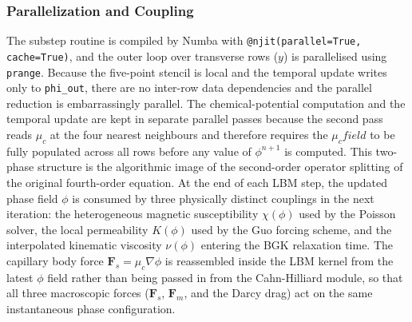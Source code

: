 \subsubsection{Parallelization and Coupling}
The substep routine is compiled by Numba with \texttt{@njit(parallel=True, cache=True)}, and the outer loop over transverse rows ($y$) is parallelised using \texttt{prange}.
Because the five-point stencil is local and the temporal update writes only to \texttt{phi\_out}, there are no inter-row data dependencies and the parallel reduction is embarrassingly parallel.
The chemical-potential computation and the temporal update are kept in separate parallel passes because the second pass reads $\mu_c$ at the four nearest neighbours and therefore requires the $\mu_c field$ to be fully populated across all rows before any value of $\phi^{n+1}$ is computed.
This two-phase structure is the algorithmic image of the second-order operator splitting of the original fourth-order equation.
At the end of each LBM step, the updated phase field $\phi$ is consumed by three physically distinct couplings in the next iteration: the heterogeneous magnetic susceptibility $\chi(\phi)$ used by the Poisson solver, the local permeability $K(\phi)$ used by the Guo forcing scheme, and the interpolated kinematic viscosity $\nu(\phi)$ entering the BGK relaxation time.
The capillary body force $\mathbf{F}_s = \mu_c \nabla \phi$ is reassembled inside the LBM kernel from the latest $\phi$ field rather than being passed in from the Cahn-Hilliard module, so that all three macroscopic forces ($\mathbf{F}_s$, $\mathbf{F}_m$, and the Darcy drag) act on the same instantaneous phase configuration.

